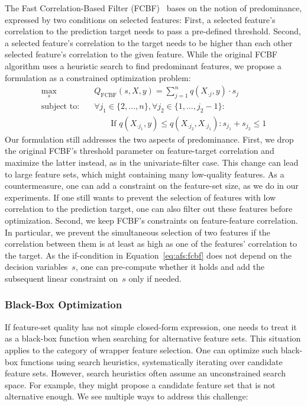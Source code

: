 \documentclass{article}
\theoremstyle{definition}
\begin{document}
The Fast Correlation-Based Filter (FCBF)~\cite{yu2003feature} bases on the notion of predominance, expressed by two conditions on selected features:
First, a selected feature's correlation to the prediction target needs to pass a pre-defined threshold.
Second, a selected feature's correlation to the target needs to be higher than each other selected feature's correlation to the given feature.
While the original FCBF algorithm uses a heuristic search to find predominant features, we propose a formulation as a constrained optimization problem:
%
\begin{equation}
	\begin{aligned}
		\max_s &\quad Q_{\text{FCBF}}(s,X,y) = \sum_{j=1}^{n} q(X_{\cdot{}j},y) \cdot s_j \\
		\text{subject to:} &\quad \forall j_1 \in \{2, \dots, n\}, \forall j_2 \in \{1, \dots, j_2 - 1\}: \\
		&\quad \quad\quad \text{If } q(X_{\cdot{}j_1},y) \leq q(X_{\cdot{}j_2}, X_{\cdot{}j_1}): s_{j_1} + s_{j_2} \leq 1
	\end{aligned}
	\label{eq:afs:fcbf}
\end{equation}
%
Our formulation still addresses the two aspects of predominance.
First, we drop the original FCBF's threshold parameter on feature-target correlation and maximize the latter instead, as in the univariate-filter case.
This change can lead to large feature sets, which might containing many low-quality features.
As a countermeasure, one can add a constraint on the feature-set size, as we do in our experiments.
If one still wants to prevent the selection of features with low correlation to the prediction target, one can also filter out these features before optimization.
Second, we keep FCBF's constraints on feature-feature correlation.
In particular, we prevent the simultaneous selection of two features if the correlation between them is at least as high as one of the features' correlation to the target.
As the if-condition in Equation~\ref{eq:afs:fcbf} does not depend on the decision variables~$s$, one can pre-compute whether it holds and add the subsequent linear constraint on~$s$ only if needed.

\subsubsection{Black-Box Optimization}
\label{sec:afs:approach:objectives:black-box}

If feature-set quality has not simple closed-form expression, one needs to treat it as a black-box function when searching for alternative feature sets.
This situation applies to the category of wrapper feature selection.
One can optimize such black-box functions using search heuristics, systematically iterating over candidate feature sets.
However, search heuristics often assume an unconstrained search space.
For example, they might propose a candidate feature set that is not alternative enough.
We see multiple ways to address this challenge:
\end{document}
